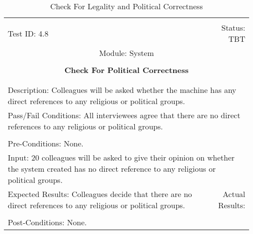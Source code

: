 \documentclass[titlepage]{article}
\begin{document}
\begin{center}%
\begin{table}[h!]
\begin{tabular}{|l r|}\hline&\\[-2mm]
	Test ID: 4.8	&Status: TBT\\[-3mm]
	\multicolumn{2}{|c|}{Module: System}\\&\\
	\multicolumn{2}{|c|}{\textbf{\large{Check For Political Correctness}}}\\&\\\hline&\\[-3mm]
	\multicolumn{2}{|p{\textwidth}|}{Description: Colleagues will be asked whether the machine has any direct references to any religious or political groups.}\\\hline
	\multicolumn{2}{|p{\textwidth}|}{Pass/Fail Conditions: All interviewees agree that there are no direct references to any religious or political groups.}\\[1mm]\hline&\\[-3mm]
	\multicolumn{2}{|p{\textwidth}|}{Pre-Conditions: None.}\\[4mm]
	\multicolumn{2}{|p{\textwidth}|}{Input: 20 colleagues will be asked to give their opinion on whether the system created has no direct reference to any religious or political groups.}\\[2mm]\hline
	\multicolumn{1}{|p{0.49\textwidth}}{Expected Results: Colleagues decide that there are no direct references to any religious or political groups.}	&\multicolumn{1}{|p{0.45\textwidth}|}{Actual Results: }\\\hline&\\[-3mm]
	\multicolumn{2}{|p{\textwidth}|}{Post-Conditions: None.}\\\hline
\end{tabular}
\caption{Check For Legality and Political Correctness}
\end{table}
\end{center}
\newpage
\end{document}

